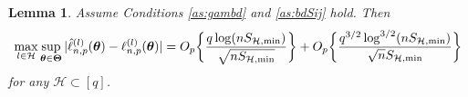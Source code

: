 \documentclass[10pt,a4paper]{amsart}
\theoremstyle{plain}
\newtheorem{lemma}{Lemma}
\theoremstyle{remark}
\newcommand{\btheta}{\boldsymbol \theta}
\newcommand{\bTheta}{\boldsymbol \Theta}
\newcommand{\btc}{{\rm c}}
\begin{document}
\begin{lemma}\label{la:uniformcov}
 Assume Conditions {\rm\ref{as:gambd}} and {\rm\ref{as:bdSij}} hold. Then  
\begin{align*}
\max_{l\in\mathcal{H}}\sup_{\btheta \in \bTheta}|\hat{\ell}_{n,p}^{(l)}(\btheta) - \ell_{n,p}^{(l)}(\btheta)|=O_{\rm p}\bigg\{\frac{q\log(nS_{\mathcal{H},\min})}{\sqrt{nS_{\mathcal{H},\min}}}\bigg\}+O_{\rm p}\bigg\{\frac{q^{3/2}\log^{3/2}(nS_{\mathcal{H},\min})}{\sqrt{n}S_{\mathcal{H},\min}}\bigg\}
\end{align*}
for any $\mathcal{H}\subset[q]$.
\end{lemma}

\end{document}
